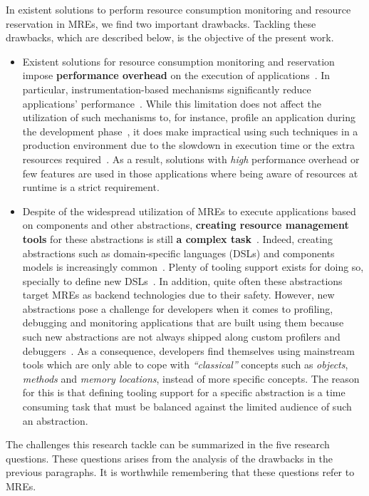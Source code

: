 In existent solutions to perform resource consumption monitoring and resource reservation in MREs, we find two important drawbacks.
Tackling these drawbacks, which are described below, is the objective of the present work.

\begin{itemize}
\item Existent solutions for resource consumption monitoring and reservation impose \textbf{performance overhead} on the execution of applications~\cite{}.
In particular, instrumentation-based mechanisms significantly reduce applications' performance~\cite{}.
While this limitation does not affect the utilization of such mechanisms to, for instance, profile an application during the development phase~\cite{}, it does make impractical using such techniques in a production environment due to the slowdown in execution time or the extra resources required~\cite{}.
As a result, solutions with \textit{high} performance overhead or few features are used in those applications where being aware of resources at runtime is a strict requirement.

\item Despite of the widespread utilization of MREs to execute applications based on components and other abstractions, \textbf{creating resource management tools} for these abstractions is still \textbf{a complex task}~\cite{}.
Indeed, creating abstractions such as domain-specific languages (DSLs) and components models is increasingly common~\cite{}.
Plenty of tooling support exists for doing so, specially to define new DSLs~\cite{}.
In addition, quite often these abstractions target MREs as backend technologies due to their safety.
However, new abstractions pose a challenge for developers when it comes to profiling, debugging and monitoring applications that are built using them because such new abstractions are not always shipped along custom profilers and debuggers~\cite{}.
As a consequence, developers find themselves using mainstream tools which are only able to cope with \textit{``classical''} concepts such as \textit{objects}, \textit{methods} and \textit{memory locations}, instead of more specific concepts.
The reason for this is that defining tooling support for a specific abstraction is a time consuming task that must be balanced against the limited audience of such an abstraction.
\end{itemize}
 
The challenges this research tackle can be summarized in the five research questions.
These questions arises from the analysis of the drawbacks in the previous paragraphs.
It is worthwhile remembering that these questions refer to MREs.

